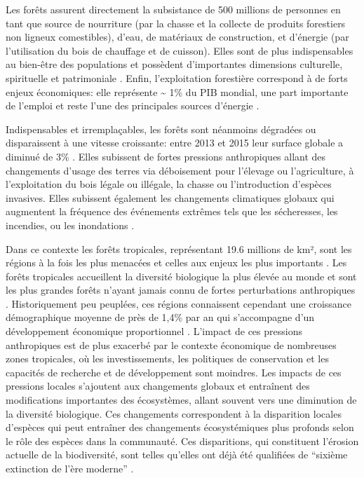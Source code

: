 \documentclass[
  11pt,
  french,
  A4paper,
  extrafontsizes,onecolumn,openright
  ]{memoir}
\begin{document}
Les forêts assurent directement la subsistance de 500 millions de
personnes en tant que source de nourriture (par la chasse et la collecte
de produits forestiers non ligneux comestibles), d'eau, de matériaux de
construction, et d'énergie (par l'utilisation du bois de chauffage et de
cuisson). Elles sont de plus indispensables au bien-être des populations
et possèdent d'importantes dimensions culturelle, spirituelle et
patrimoniale \autocites{FRA2015}{Tilman2014}. Enfin, l'exploitation
forestière correspond à de forts enjeux économiques: elle représente
\textasciitilde{} 1\% du PIB mondial, une part importante de l'emploi et
reste l'une des principales sources d'énergie
\autocites{CBDdiversity2011}{FAO2014}.

Indispensables et irremplaçables, les forêts sont néanmoins dégradées ou
disparaissent à une vitesse croissante: entre 2013 et 2015 leur surface
globale a diminué de 3\% \autocite{FAO2009}. Elles subissent de fortes
pressions anthropiques allant des changements d'usage des terres via
déboisement pour l'élevage ou l'agriculture, à l'exploitation du bois
légale ou illégale, la chasse ou l'introduction d'espèces invasives.
Elles subissent également les changements climatiques globaux qui
augmentent la fréquence des événements extrêmes tels que les
sécheresses, les incendies, ou les inondations
\autocite{Pachauri2014}.\newline

Dans ce contexte les forêts tropicales, représentant 19.6 millions de
km², sont les régions à la fois les plus menacées et celles aux enjeux
les plus importants \autocite{Barlow2018}. Les forêts tropicales
accueillent la diversité biologique la plus élevée au monde et sont les
plus grandes forêts n'ayant jamais connu de fortes perturbations
anthropiques \autocites{Gentry1988}{FAO2011}. Historiquement peu
peuplées, ces régions connaissent cependant une croissance démographique
moyenne de près de 1,4\% par an qui s'accompagne d'un développement
économique proportionnel \autocite{Asner2009}. L'impact de ces pressions
anthropiques est de plus exacerbé par le contexte économique de
nombreuses zones tropicales, où les investissements, les politiques de
conservation et les capacités de recherche et de développement sont
moindres. Les impacts de ces pressions locales s'ajoutent aux
changements globaux et entraînent des modifications importantes des
écosystèmes, allant souvent vers une diminution de la diversité
biologique. Ces changements correspondent à la disparition locales
d'espèces qui peut entraîner des changements écosystémiques plus
profonds selon le rôle des espèces dans la communauté. Ces disparitions,
qui constituent l'érosion actuelle de la biodiversité, sont telles
qu'elles ont déjà été qualifiées de ``sixième extinction de l'ère
moderne'' \autocites{Vitousek1997}{Cardinale2012}.
\end{document}
